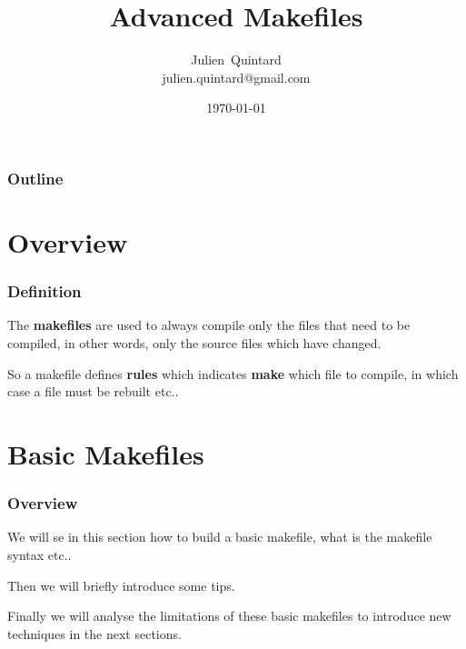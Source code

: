 \documentclass[8pt]{beamer}
\title{Advanced Makefiles}
\author
{
  Julien~Quintard\inst{1} \\
  {\tiny julien.quintard@gmail.com}
}
\institute
{
  \inst{1} kaneton distributed operating system project
}
\date{\today}
\newcommand{\nl}[0]{\vspace{0.4cm}}
\begin{document}
%
%

\begin{frame}
  \titlepage

  \begin{center}
     \hspace{0.1cm}  \hspace{0.1cm}
     \hspace{0.1cm}
  \end{center}
\end{frame}

%
%

\begin{frame}
  \frametitle{Outline}
  \tableofcontents
\end{frame}

%
%

\section{Overview}


\begin{frame}
  \frametitle{Definition}

  The \textbf{makefiles} are used to always compile only the files
  that need to be compiled, in other words, only the source files which
  have changed.

  \nl

  So a makefile defines \textbf{rules} which indicates \textbf{make}
  which file to compile, in which case a file must be rebuilt etc..
\end{frame}

%
%

\section{Basic Makefiles}


\begin{frame}
  \frametitle{Overview}

  We will se in this section how to build a basic makefile, what is the
  makefile syntax etc..

  \nl

  Then we will briefly introduce some tips.

  \nl

  Finally we will analyse the limitations of these basic makefiles to
  introduce new techniques in the next sections.
\end{frame}
\end{document}
